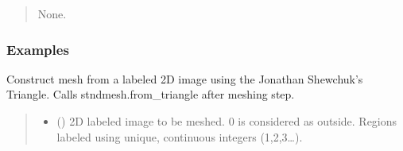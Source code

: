 \documentclass[letterpaper,10pt,english]{sphinxmanual}
\begin{document}
\begin{fulllineitems}
\begin{fulllineitems}
\begin{quote}
\begin{description}
\sphinxAtStartPar
None.

\end{description}\end{quote}
\subsubsection*{Examples}

\begin{sphinxVerbatim}[commandchars=\\\{\}]
  
\end{sphinxVerbatim}

\end{fulllineitems}


\begin{fulllineitems}
\label{\detokenize{_autosummary/nirfasterff.base.dcs_mesh.dcsmesh:nirfasterff.base.dcs_mesh.dcsmesh.from_image}}
\pysigstartsignatures
{}
\pysigstopsignatures
\sphinxAtStartPar
Construct mesh from a labeled 2D image using the Jonathan Shewchuk’s Triangle. Calls stndmesh.from\_triangle after meshing step.
\begin{quote}\begin{description}
\begin{itemize}
\item {} 
\sphinxAtStartPar
{} (\sphinxstyleliteralemphasis{\sphinxupquote{ (}}\sphinxstyleliteralemphasis{\sphinxupquote{) }}) \textendash{} 2D labeled image to be meshed. 0 is considered as outside. Regions labeled using unique, continuous integers (1,2,3…).


\end{itemize}
\end{description}
\end{quote}
\end{fulllineitems}
\end{fulllineitems}
\end{document}
